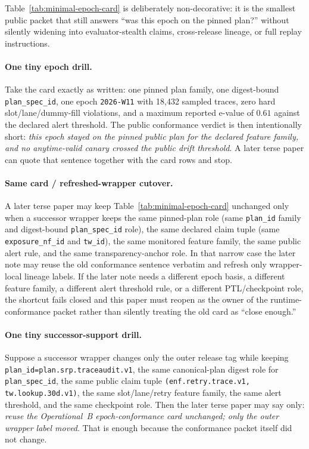 \documentclass[11pt]{article}
\begin{document}
Table~\ref{tab:minimal-epoch-card} is deliberately non-decorative: it is the smallest public packet that still answers ``was this epoch on the pinned plan?'' without silently widening into evaluator-stealth claims, cross-release lineage, or full replay instructions.

\paragraph{One tiny epoch drill.}
Take the card exactly as written: one pinned plan family, one digest-bound \texttt{plan\_spec\_id}, one epoch \texttt{2026-W11} with 18{,}432 sampled traces, zero hard slot/lane/dummy-fill violations, and a maximum reported e-value of $0.61$ against the declared alert threshold. The public conformance verdict is then intentionally short: \emph{this epoch stayed on the pinned public plan for the declared feature family, and no anytime-valid canary crossed the public drift threshold}. A later terse paper can quote that sentence together with the card rows and stop.

\paragraph{Same card / refreshed-wrapper cutover.}
A later terse paper may keep Table~\ref{tab:minimal-epoch-card} unchanged only when a successor wrapper keeps the same pinned-plan role (same \texttt{plan\_id} family and digest-bound \texttt{plan\_spec\_id} role), the same declared claim tuple (same \texttt{exposure\_nf\_id} and \texttt{tw\_id}), the same monitored feature family, the same public alert rule, and the same transparency-anchor role. In that narrow case the later note may reuse the old conformance sentence verbatim and refresh only wrapper-local lineage labels. If the later note needs a different epoch basis, a different feature family, a different alert threshold rule, or a different PTL/checkpoint role, the shortcut fails closed and this paper must reopen as the owner of the runtime-conformance packet rather than silently treating the old card as ``close enough.''\cite{series:workedexample,series:seriesspines}

\paragraph{One tiny successor-support drill.}
Suppose a successor wrapper changes only the outer release tag while keeping \texttt{plan\_id=plan.srp.traceaudit.v1}, the same canonical-plan digest role for \texttt{plan\_spec\_id}, the same public claim tuple \texttt{(enf.retry.trace.v1, tw.lookup.30d.v1)}, the same slot/lane/retry feature family, the same alert threshold, and the same checkpoint role. Then the later terse paper may say only: \emph{reuse the Operational~B epoch-conformance card unchanged; only the outer wrapper label moved}. That is enough because the conformance packet itself did not change.
\end{document}
